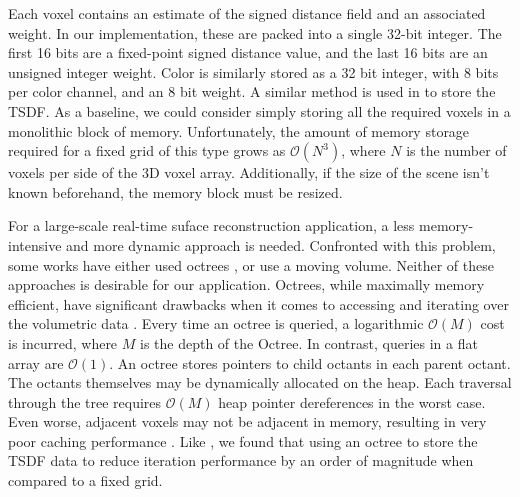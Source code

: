 \documentclass[conference]{IEEEtran}
\newcommand{\TSDF}{TSDF\xspace}
\begin{document}
Each voxel contains an estimate of the signed distance field and an
associated weight. In our implementation, these are packed into a single 32-bit
integer. The first 16 bits are a fixed-point signed distance value, and the
last 16 bits  are an unsigned integer weight. Color is similarly
stored as a 32 bit integer, with 8 bits per color channel, and an 8 bit weight.
A similar method is used in \cite{Newcombe, Whelan2013, Bylow2013, NiessnerHashing} to store
the \TSDF. As a baseline, we could consider simply storing all the required
voxels in a monolithic block of memory. Unfortunately, the amount of memory storage required
for a fixed grid of this type grows as $\mathcal{O}(N^3)$, where $N$ is the
number of voxels per side of the 3D voxel array. Additionally, if the size of
the scene isn't known beforehand, the memory block must be resized.


For a large-scale real-time suface reconstruction application, a less
memory-intensive and more dynamic approach is needed. Confronted with this
problem, some works have either used  octrees \cite{Wurm2010, Zeng2012,
Chen2012}, or use a moving volume\cite{Whelan2013}. Neither of these approaches
is desirable for our application. Octrees, while maximally memory efficient,
have significant drawbacks when it comes to accessing and iterating over the
volumetric data \cite{NiessnerHashing}. Every time an octree is queried,  a
logarithmic $\mathcal{O}(M)$ cost is incurred, where $M$ is the depth of the
Octree. In contrast, queries in a flat array are $\mathcal{O}(1)$. An octree
stores pointers to child octants in each parent octant. The octants themselves
may be dynamically allocated on the heap. Each traversal through the tree
requires $\mathcal{O}(M)$ heap pointer dereferences in the worst case.
Even worse, adjacent voxels may not be adjacent in memory, resulting in very
poor caching performance \cite{CacheStructures}.  Like \cite{NiessnerHashing},
we found that using an octree to store the \TSDF data to reduce iteration
performance by an order of magnitude when compared to a fixed grid.
\end{document}
